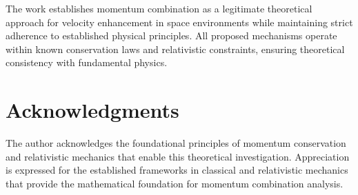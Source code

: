 \documentclass[11pt,a4paper]{article}
\theoremstyle{remark}
\begin{document}
The work establishes momentum combination as a legitimate theoretical approach for velocity enhancement in space environments while maintaining strict adherence to established physical principles. All proposed mechanisms operate within known conservation laws and relativistic constraints, ensuring theoretical consistency with fundamental physics.

\section*{Acknowledgments}

The author acknowledges the foundational principles of momentum conservation and relativistic mechanics that enable this theoretical investigation. Appreciation is expressed for the established frameworks in classical and relativistic mechanics that provide the mathematical foundation for momentum combination analysis.
\end{document}
